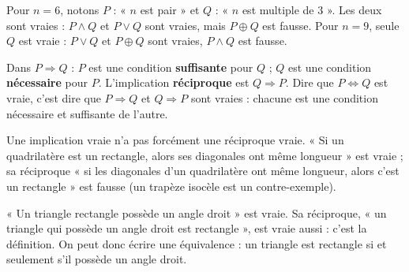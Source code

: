 \begin{example}
Pour $n=6$, notons $P$ : « $n$ est pair » et $Q$ : « $n$ est multiple de $3$ ». Les deux sont vraies : $P\land Q$ et $P\lor Q$ sont vraies, mais $P\oplus Q$ est fausse. Pour $n=9$, seule $Q$ est vraie : $P\lor Q$ et $P\oplus Q$ sont vraies, $P\land Q$ est fausse.
\end{example}
\begin{keypoint}
Dans $P\Rightarrow Q$ : $P$ est une condition \textbf{suffisante} pour $Q$ ; $Q$ est une condition \textbf{nécessaire} pour $P$. L'implication \textbf{réciproque} est $Q\Rightarrow P$. Dire que $P\Leftrightarrow Q$ est vraie, c'est dire que $P\Rightarrow Q$ et $Q\Rightarrow P$ sont vraies : chacune est une condition nécessaire et suffisante de l'autre.
\end{keypoint}
\begin{pitfall}
Une implication vraie n'a pas forcément une réciproque vraie. « Si un quadrilatère est un rectangle, alors ses diagonales ont même longueur » est vraie ; sa réciproque « si les diagonales d'un quadrilatère ont même longueur, alors c'est un rectangle » est fausse (un trapèze isocèle est un contre-exemple).
\end{pitfall}
\begin{example}
« Un triangle rectangle possède un angle droit » est vraie. Sa réciproque, « un triangle qui possède un angle droit est rectangle », est vraie aussi : c'est la définition. On peut donc écrire une équivalence : un triangle est rectangle si et seulement s'il possède un angle droit.
\end{example}

